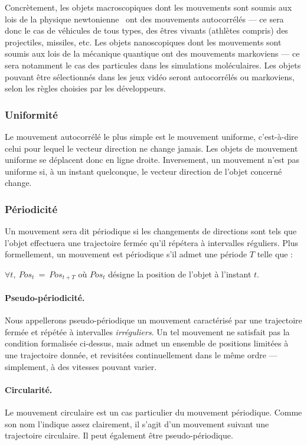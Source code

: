     Concrètement, les objets macroscopiques dont les mouvements sont soumis aux lois de la physique newtonienne~\cite{newton1833philosophiae} ont des mouvements autocorrélés --- ce sera donc le cas de véhicules de tous types, des êtres vivants (athlètes compris) des projectiles, missiles, etc. Les objets nanoscopiques dont les mouvements sont soumis aux lois de la mécanique quantique ont des mouvements markoviens --- ce sera notamment le cas des particules dans les simulations moléculaires. Les objets pouvant être sélectionnés dans les jeux vidéo seront autocorrélés ou markoviens, selon les règles choisies par les développeurs.

    \subsubsection{Uniformité}
    Le mouvement autocorrélé le plus simple est le mouvement uniforme, c'est-à-dire celui pour lequel le vecteur direction ne change jamais. Les objets de mouvement uniforme se déplacent donc en ligne droite. Inversement, un mouvement n'est pas uniforme si, à un instant quelconque, le vecteur direction de l'objet concerné change.

    \subsubsection{Périodicité}
    Un mouvement sera dit périodique si les changements de directions sont tels que l'objet effectuera une trajectoire fermée qu'il répétera à intervalles réguliers. Plus formellement, un mouvement est périodique s'il admet une période $T$ telle que :
    
    $\forall t,~Pos_{t}~=~Pos_{t+T}$ où $Pos_{t}$ désigne la position de l'objet à l'instant $t$.
    
    \paragraph{Pseudo-périodicité.}
    Nous appellerons pseudo-périodique un mouvement caractérisé par une trajectoire fermée et répétée à intervalles \emph{irréguliers}. Un tel mouvement ne satisfait pas la condition formalisée ci-dessus, mais admet un ensemble de positions limitées à une trajectoire donnée, et revisitées continuellement dans le même ordre --- simplement, à des vitesses pouvant varier.

    \paragraph{Circularité.}
    Le mouvement circulaire est un cas particulier du mouvement périodique. Comme son nom l'indique assez clairement, il s'agit d'un mouvement suivant une trajectoire circulaire. Il peut également être pseudo-périodique.
    
